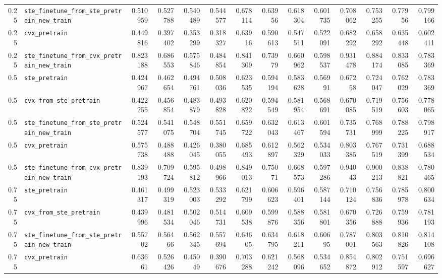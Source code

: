 \begin{longtable}{@{}r l *{12}{r}@{}}
0.25 & \texttt{ste\_finetune\_from\_ste\_pretrain\_new\_train} & 0.510959 & 0.527788 & 0.540489 & 0.544577 & 0.678114 & 0.63956 & 0.618304 & 0.601735 & 0.708062 & 0.753255 & 0.77956 & 0.799166 \\
0.25 & \texttt{cvx\_pretrain} & 0.449816 & 0.397402 & 0.353299 & 0.318327 & 0.63916 & 0.590613 & 0.547511 & 0.522091 & 0.682292 & 0.658292 & 0.635448 & 0.602411 \\
0.25 & \texttt{ste\_finetune\_from\_cvx\_pretrain\_new\_train} & 0.823188 & 0.686553 & 0.575846 & 0.484854 & 0.841309 & 0.73979 & 0.660962 & 0.598537 & 0.931478 & 0.884174 & 0.833085 & 0.783369 \\
0.5 & \texttt{ste\_pretrain} & 0.424967 & 0.462654 & 0.494761 & 0.508036 & 0.623535 & 0.594194 & 0.583628 & 0.56991 & 0.67258 & 0.724047 & 0.762029 & 0.783369 \\
0.5 & \texttt{cvx\_from\_ste\_pretrain} & 0.422255 & 0.456854 & 0.483879 & 0.493828 & 0.620822 & 0.594549 & 0.581954 & 0.568691 & 0.670085 & 0.719519 & 0.756603 & 0.778065 \\
0.5 & \texttt{ste\_finetune\_from\_ste\_pretrain\_new\_train} & 0.524577 & 0.541075 & 0.548704 & 0.551745 & 0.659722 & 0.632043 & 0.613467 & 0.601594 & 0.735731 & 0.768999 & 0.788225 & 0.798917 \\
0.5 & \texttt{cvx\_pretrain} & 0.575738 & 0.488488 & 0.426045 & 0.380055 & 0.685493 & 0.612897 & 0.562329 & 0.534033 & 0.803385 & 0.767519 & 0.731399 & 0.688534 \\
0.5 & \texttt{ste\_finetune\_from\_cvx\_pretrain\_new\_train} & 0.839193 & 0.709724 & 0.595812 & 0.498966 & 0.849013 & 0.75071 & 0.668573 & 0.597286 & 0.94043 & 0.900213 & 0.838821 & 0.780465 \\
0.75 & \texttt{ste\_pretrain} & 0.461317 & 0.499319 & 0.523003 & 0.533292 & 0.621799 & 0.606623 & 0.596401 & 0.587144 & 0.710124 & 0.756836 & 0.785978 & 0.800634 \\
0.75 & \texttt{cvx\_from\_ste\_pretrain} & 0.439996 & 0.481534 & 0.502046 & 0.514731 & 0.609538 & 0.599876 & 0.588356 & 0.581801 & 0.670356 & 0.726888 & 0.759936 & 0.781193 \\
0.75 & \texttt{ste\_finetune\_from\_ste\_pretrain\_new\_train} & 0.55702 & 0.56466 & 0.562345 & 0.557694 & 0.64605 & 0.634795 & 0.618211 & 0.60695 & 0.787001 & 0.803563 & 0.810826 & 0.814108 \\
0.75 & \texttt{cvx\_pretrain} & 0.63661 & 0.526426 & 0.45049 & 0.390676 & 0.703288 & 0.621242 & 0.568096 & 0.534652 & 0.854872 & 0.802912 & 0.751597 & 0.696627 \\

\end{longtable}
